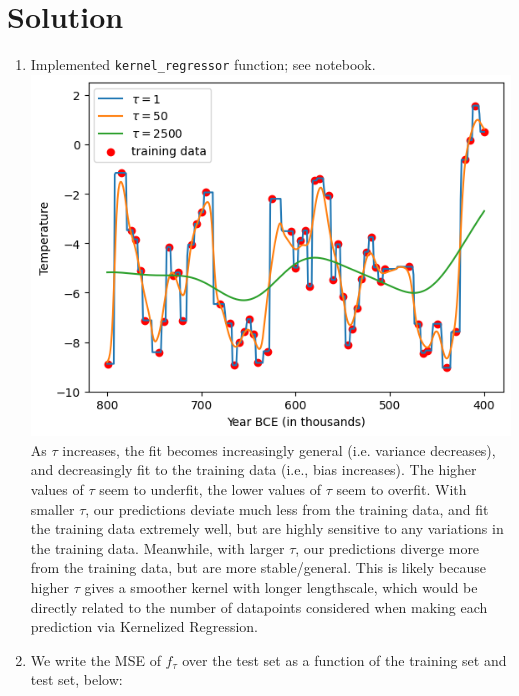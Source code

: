 \documentclass[submit]{harvardml}
\newenvironment{solution}
  {\color{blue}\section*{Solution}}
{}
\begin{document}
\begin{solution}
	\begin{enumerate}
    \item Implemented \texttt{kernel\_regressor} function; see notebook.\\

    \includegraphics[scale=0.8]{images/p1.2.png}\\
    As $\tau$ increases, the fit becomes increasingly general (i.e. variance decreases), and decreasingly fit to the training data (i.e., bias increases). 
    The higher values of $\tau$ seem to underfit, the lower values of $\tau$ seem to overfit.
    With smaller $\tau$, our predictions deviate much less from the training data, and fit the training data extremely well, but are highly sensitive to any variations in the training data. 
    Meanwhile, with larger $\tau$, our predictions diverge more from the training data, but are more stable/general.
    This is likely because higher $\tau$ gives a smoother kernel with longer lengthscale, which would be directly related to the number of datapoints considered when making each prediction via Kernelized Regression.
    \item We write the MSE of $f_{\tau}$ over the test set as a function of the training set and test set, below:


\end{enumerate}
\end{solution}
\end{document}
